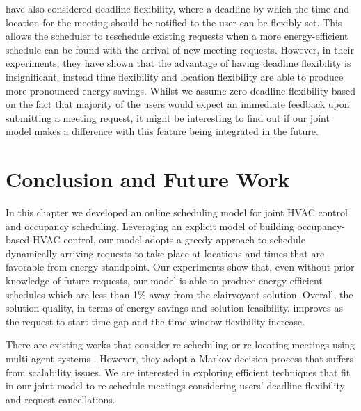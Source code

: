 \cite{kwak2013tesla} have also considered deadline flexibility, where a deadline by which the time and location for the meeting should be notified to the user can be flexibly set. This allows the scheduler to reschedule existing requests when a more energy-efficient schedule can be found with the arrival of new meeting requests. However, in their experiments, they have shown that the advantage of having deadline flexibility is insignificant, instead time flexibility and location flexibility are able to produce more pronounced energy savings.
Whilst we assume zero deadline flexibility based on the fact that majority of the users would expect an immediate feedback upon submitting a meeting request, it might be interesting to find out if our joint model makes a difference with this feature being integrated in the future. 


\section{Conclusion and Future Work} \label{sec:online:conclusion}





In this chapter we developed an online scheduling model for joint HVAC control and occupancy scheduling. Leveraging an explicit model of building occupancy-based HVAC control, our model adopts a greedy approach to schedule dynamically arriving requests to take place at locations and times that are favorable from energy standpoint. Our experiments show that, even without prior knowledge of future requests, our model is able to produce energy-efficient schedules which are less than 1\% away from the clairvoyant solution. Overall, the solution quality, in terms of energy savings and solution feasibility, improves as the request-to-start time gap and the time window flexibility increase. 

There are existing works that consider re-scheduling or re-locating meetings using multi-agent systems \citep{kwak2014building,klein2012coordinating}. However, they adopt a Markov decision process that suffers from scalability issues. We are interested in exploring efficient techniques that fit in our joint model to re-schedule meetings considering users' deadline flexibility and request cancellations. 

